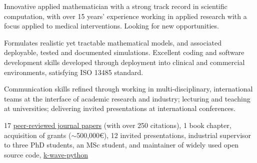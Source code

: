 \documentclass[english]{cv-style}
\begin{document}

Innovative applied mathematician with a strong track record in scientific computation, with over 15 years' experience working in applied research with a focus  applied to medical interventions. Looking for new opportunities.
  \begin{NoHyphItemize}
    \item Formulates realistic yet tractable mathematical models, and associated deployable, tested and documented simulations.  Excellent coding and software development skills developed through deployment into clinical and commercial environments, satisfying ISO 13485 standard.  
    \item Communication skills refined through working in multi-disciplinary, international teams at the interface of academic research and industry; lecturing and teaching at universities; delivering invited presentations at international conferences.
    \item 17 \href{https://scholar.google.co.uk/citations?user=lauJqakAAAAJ&hl=en}{peer-reviewed journal papers} (with over 250 citations), 1 book chapter, acquisition of grants ($\sim$500,000\euro), 12 invited presentations, industrial supervisor to three PhD students, an MSc student, and maintainer of widely used open source code, \href{https://k-wave-python.readthedocs.io/en/latest/index.html#citation}{k-wave-python}
  \end{NoHyphItemize}
  
\vfill
\end{document}
